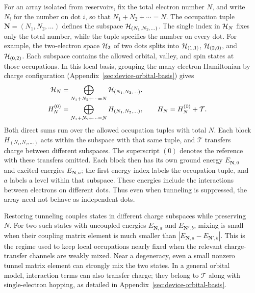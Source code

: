 For an array isolated from reservoirs, fix the total electron number
$N$, and write $N_i$ for the number on dot $i$, so that
$N_1+N_2+\cdots=N$. The occupation tuple
$\mathbf N=(N_1,N_2,\ldots)$ defines the subspace
$\mathcal{H}_{(N_1,N_2,\ldots)}$. The single index in $\mathcal{H}_N$
fixes only the total number, while the tuple specifies the number
on every dot. For example, the two-electron space $\mathcal{H}_2$ of
two dots splits into $\mathcal{H}_{(1,1)}$, $\mathcal{H}_{(2,0)}$, and
$\mathcal{H}_{(0,2)}$. Each subspace contains the allowed orbital,
valley, and spin states at those occupations. In this local basis,
grouping the many-electron Hamiltonian by charge configuration
(Appendix~\ref{sec:device-orbital-basis}) gives
\begin{equation}
 \begin{aligned}
  \Hilb_N&=\bigoplus_{N_1+N_2+\cdots=N}
                 \Hilb_{(N_1,N_2,\ldots)},\\
  H_N^{(0)}&=\bigoplus_{N_1+N_2+\cdots=N}
                 H_{(N_1,N_2,\ldots)},
  \qquad H_N=H_N^{(0)}+\mathcal T.
 \end{aligned}
 \label{eq:dot-charge-blocks}
\end{equation}
Both direct sums run over the allowed occupation tuples with total
$N$. Each block $H_{(N_1,N_2,\ldots)}$ acts within the subspace with
that same tuple, and $\mathcal T$ transfers charge between different
subspaces. The superscript $(0)$ denotes the reference with these
transfers omitted. Each block then has its own ground energy
$E_{\mathbf N,0}$ and excited energies $E_{\mathbf N,a}$; the first
energy index labels the occupation tuple, and $a$ labels a level
within that subspace. These energies include the interactions
between electrons on different dots. Thus even when tunneling is
suppressed, the array need not behave as independent dots.

Restoring tunneling couples states in different charge subspaces
while preserving $N$. For two such states with uncoupled energies
$E_{\mathbf N,a}$ and $E_{\mathbf N',b}$, mixing is small when their
coupling matrix element is much smaller than
$|E_{\mathbf N,a}-E_{\mathbf N',b}|$. This is the regime used to keep
local occupations nearly fixed when the relevant charge-transfer
channels are weakly mixed. Near a degeneracy, even a small
nonzero tunnel matrix element can strongly mix the two states.
In a general orbital model, interaction terms can also transfer
charge; they belong to $\mathcal T$ along with single-electron
hopping, as detailed in Appendix~\ref{sec:device-orbital-basis}.

